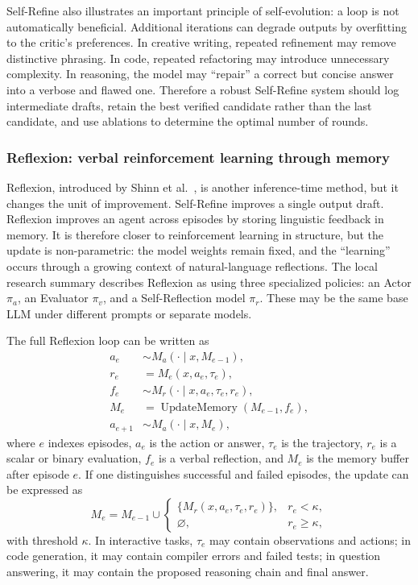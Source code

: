 Self-Refine also illustrates an important principle of self-evolution: a loop is not automatically beneficial. Additional iterations can degrade outputs by overfitting to the critic's preferences. In creative writing, repeated refinement may remove distinctive phrasing. In code, repeated refactoring may introduce unnecessary complexity. In reasoning, the model may ``repair'' a correct but concise answer into a verbose and flawed one. Therefore a robust Self-Refine system should log intermediate drafts, retain the best verified candidate rather than the last candidate, and use ablations to determine the optimal number of rounds.

\subsubsection{Reflexion: verbal reinforcement learning through memory}
\label{subsubsec:reflexion}

Reflexion, introduced by Shinn et al.\ \cite{shinn2023reflexion}, is another inference-time method, but it changes the unit of improvement. Self-Refine improves a single output draft. Reflexion improves an agent across episodes by storing linguistic feedback in memory. It is therefore closer to reinforcement learning in structure, but the update is non-parametric: the model weights remain fixed, and the ``learning'' occurs through a growing context of natural-language reflections. The local research summary describes Reflexion as using three specialized policies: an Actor $\pi_a$, an Evaluator $\pi_v$, and a Self-Reflection model $\pi_r$. These may be the same base LLM under different prompts or separate models.

The full Reflexion loop can be written as
\begin{align}
    a_e &\sim M_a(\cdot \mid x, M_{e-1}), \\
    r_e &= M_e(x,a_e,\tau_e), \\
    f_e &\sim M_r(\cdot \mid x,a_e,\tau_e,r_e), \\
    M_e &= \operatorname{UpdateMemory}(M_{e-1}, f_e), \\
    a_{e+1} &\sim M_a(\cdot \mid x, M_e),
    \label{eq:reflexion-loop}
\end{align}
where $e$ indexes episodes, $a_e$ is the action or answer, $\tau_e$ is the trajectory, $r_e$ is a scalar or binary evaluation, $f_e$ is a verbal reflection, and $M_e$ is the memory buffer after episode $e$. If one distinguishes successful and failed episodes, the update can be expressed as
\begin{equation}
    M_e = M_{e-1} \cup
    \begin{cases}
    \{M_r(x,a_e,\tau_e,r_e)\}, & r_e < \kappa,\\
    \varnothing, & r_e \geq \kappa,
    \end{cases}
    \label{eq:reflexion-memory-update}
\end{equation}
with threshold $\kappa$. In interactive tasks, $\tau_e$ may contain observations and actions; in code generation, it may contain compiler errors and failed tests; in question answering, it may contain the proposed reasoning chain and final answer.


